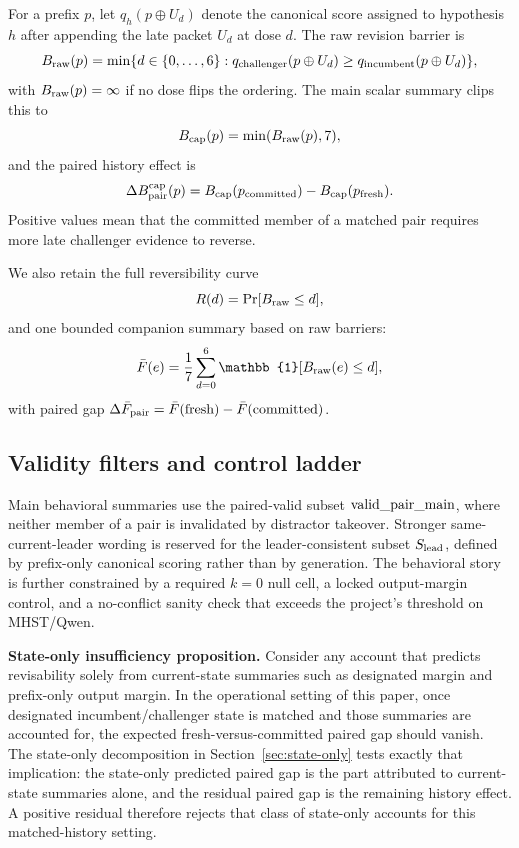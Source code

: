 For a prefix $p$, let $q_h(p\oplus U_d)$ denote the canonical score assigned to hypothesis $h$ after appending the late packet $U_d$ at dose $d$. The raw revision barrier is
\begin{equation}
    B_{\mathrm{raw}}(p) = \min\{d\in\{0,\ldots,6\}: q_{\text{challenger}}(p\oplus U_d) \ge q_{\text{incumbent}}(p\oplus U_d)\},
\end{equation}
with $B_{\mathrm{raw}}(p)=\infty$ if no dose flips the ordering. The main scalar summary clips this to
\begin{equation}
    B_{\mathrm{cap}}(p) = \min(B_{\mathrm{raw}}(p), 7),
\end{equation}
and the paired history effect is
\begin{equation}
    \Delta B_{\mathrm{pair}}^{\mathrm{cap}}(p) = B_{\mathrm{cap}}(p_{\text{committed}}) - B_{\mathrm{cap}}(p_{\text{fresh}}).
\end{equation}
Positive values mean that the committed member of a matched pair requires more late challenger evidence to reverse.

We also retain the full reversibility curve
\begin{equation}
    R(d) = \Pr[B_{\mathrm{raw}} \le d],
\end{equation}
and one bounded companion summary based on raw barriers:
\begin{equation}
    \MeanFlip(e) = \frac{1}{7}\sum_{d=0}^{6} \mathbb{1}[\Braw(e) \le d],
\end{equation}
with paired gap $\Delta \bar{F}_{\mathrm{pair}} = \bar{F}(\text{fresh}) - \bar{F}(\text{committed})$.

\subsection{Validity filters and control ladder}

Main behavioral summaries use the paired-valid subset $\mathrm{valid\_pair\_main}$, where neither member of a pair is invalidated by distractor takeover. Stronger same-current-leader wording is reserved for the leader-consistent subset $S_{\mathrm{lead}}$, defined by prefix-only canonical scoring rather than by generation. The behavioral story is further constrained by a required $k{=}0$ null cell, a locked output-margin control, and a no-conflict sanity check that exceeds the project's threshold on MHST/Qwen.

\begin{tcolorbox}[colback=softgreen,colframe=residual!60!black,boxrule=0.8pt,arc=2pt,left=8pt,right=8pt,top=6pt,bottom=6pt]
\textbf{State-only insufficiency proposition.} Consider any account that predicts revisability solely from current-state summaries such as designated margin and prefix-only output margin. In the operational setting of this paper, once designated incumbent/challenger state is matched and those summaries are accounted for, the expected fresh-versus-committed paired gap should vanish. The state-only decomposition in Section~\ref{sec:state-only} tests exactly that implication: the state-only predicted paired gap is the part attributed to current-state summaries alone, and the residual paired gap is the remaining history effect. A positive residual therefore rejects that class of state-only accounts for this matched-history setting.
\end{tcolorbox}
